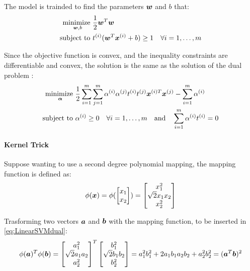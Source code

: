 The model is trainded to find the parameters $\bm{w}$ and $b$ that:
\begin{align}
    \label{eq:LinearSVM}
    \underset{\bm{w},b}{\text{minimize }} & \frac{1}{2}\bm{w}^T\bm{w} \\
    \text{subject to } & t^{(i)}(\bm{w}^T\bm{x}^{(i)} + b) \geq 1 \quad \forall i = 1, \dots, m
\end{align}

Since the objective function is convex, and the inequality constraints are differentiable and convex, the solution is the same as the solution of the dual problem :
\begin{align}
    \label{eq:LinearSVMdual}
    \underset{\bm{\alpha}}{\text{minimize }} & \frac{1}{2}\sum_{i=1}^{m}\sum_{j=1}^{m}\alpha^{(i)}\alpha^{(j)}t^{(i)}t^{(j)}\bm{x}^{(i)T}\bm{x}^{(j)} -\sum_{i=1}^{m}\alpha^{(i)}\\
    \text{subject to } & \alpha^{(i)} \geq 0 \quad \forall i = 1, \dots, m \quad \text{and} \quad \sum_{i=1}^{m}\alpha^{(i)}t^{(i)}=0
\end{align}

\paragraph{Kernel Trick}
Suppose wanting to use a second degree polynomial mapping, the mapping function is defined as:
\begin{equation}
    \phi(\bm{x}) = \phi(\begin{bmatrix}
        x_1 \\
        x_2 \\
    \end{bmatrix}) = \begin{bmatrix}
        x_1^2 \\
        \sqrt{2}x_1x_2 \\
        x_2^2 \\
    \end{bmatrix}
\end{equation}

Trasforming two vectors $\bm{a}$ and $\bm{b}$ with the mapping function, to be inserted in \autoref{eq:LinearSVMdual}:
\begin{equation}
    \phi(\bm{a})^T\phi(\bm{b}) = \begin{bmatrix}
        a_1^2 \\
        \sqrt{2}a_1a_2 \\
        a_2^2 \\
    \end{bmatrix}^T
    \begin{bmatrix}
        b_1^2 \\
        \sqrt{2}b_1b_2 \\
        b_2^2 \\
    \end{bmatrix} = a_1^2b_1^2 + 2a_1b_1a_2b_2 + a_2^2b_2^2 = (\bm{a}^T\bm{b})^2
\end{equation}

